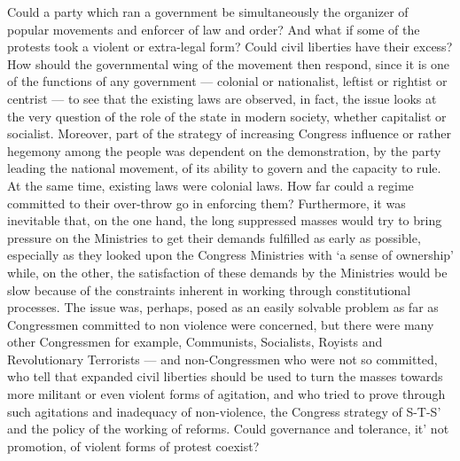 \begin{multicols}{2}
Could a party which ran a government be simultaneously the organizer of popular movements and enforcer of law and order? And what if some of the protests took a violent or extra-legal form? Could civil liberties have their excess? How should the governmental wing of the movement then respond, since it is one of the functions of any government --- colonial or nationalist, leftist or rightist or centrist --- to see that the existing laws are observed, in fact, the issue looks at the very question of the role of the state in modern society, whether capitalist or socialist. Moreover, part of the strategy of increasing Congress influence or rather hegemony among the people was dependent on the demonstration, by the party leading the national movement, of its ability to govern and the capacity to rule. At the same time, existing laws were colonial laws. How far could a regime committed to their over-throw go in enforcing them? Furthermore, it was inevitable that, on the one hand, the long suppressed masses would try to bring pressure on the Ministries to get their demands fulfilled as early as possible, especially as they looked upon the Congress Ministries with `a sense of ownership' while, on the other, the satisfaction of these demands by the Ministries would be slow because of the constraints inherent in working through constitutional processes. The issue was, perhaps, posed as an easily solvable problem as far as Congressmen committed to non violence were concerned, but there were many other Congressmen for example, Communists, Socialists, Royists and Revolutionary Terrorists --- and non-Congressmen who were not so committed, who tell that expanded civil liberties should be used to turn the masses towards more militant or even violent forms of agitation, and who tried to prove through such agitations and inadequacy of non-violence, the Congress strategy of S-T-S' and the policy of the working of reforms. Could governance and tolerance, it' not promotion, of violent forms of protest coexist?


\end{multicols}
